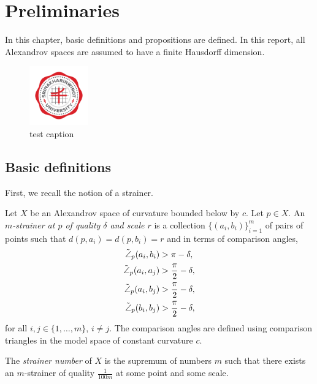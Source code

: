 \documentclass[ma493]{swumath}
\begin{document}
\chapter{Preliminaries}
In this chapter, basic definitions and propositions are defined. In this report, all Alexandrov spaces are assumed to have a finite Hausdorff dimension.

\begin{figure}
\begin{center}
\includegraphics[width=1in]{Srinakharinwirot_Logo_EN_Color.png}
\caption{test caption}
\end{center}
\end{figure}
 
\section{Basic definitions} 
First, we recall the notion of a strainer.
\begin{definition}
Let $X$ be an Alexandrov space of curvature bounded below by $c$. Let $p \in X$.
An \emph{$m$-strainer at $p$ of quality $\delta$ and scale $r$} is a collection $\{(a_i, b_i)\}_{i=1}^m$ 
of pairs of points such that $d(p,a_i) = d(p, b_i) = r$ and in terms of comparison angles,
\begin{align}
\tilde{\angle}_p(a_i, b_i) & > \pi - \delta, \\
\tilde{\angle}_p(a_i, a_j) & > \frac{\pi}{2} - \delta, \notag \\
\tilde{\angle}_p(a_i, b_j) & > \frac{\pi}{2} - \delta, \notag \\
\tilde{\angle}_p(b_i, b_j) & > \frac{\pi}{2} - \delta, \notag 
\end{align}
for all $i,j \in \{1, \ldots, m\}$, $i \neq j$.
The comparison angles are defined using comparison triangles in the model space of constant curvature $c$.
\end{definition}

\begin{definition}
The \emph{strainer number} of $X$ is the supremum of numbers $m$ such that there exists an $m$-strainer of quality $\frac{1}{100m}$ at some point and some scale.
\end{definition}
 
\end{document}
